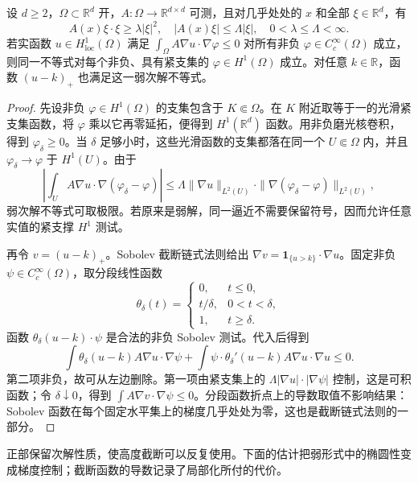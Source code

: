 \begin{lemma}
\label{b2:lem:H2-sobolev-tests}
设 \(d\geq2\)，\(\Omega\subset\mathbb R^d\) 开，\(A:\Omega\to\mathbb R^{d\times d}\) 可测，且对几乎处处的 \(x\) 和全部 \(\xi\in\mathbb R^d\)，有
\[
 A(x)\xi\cdot\xi\geq\lambda|\xi|^2,
 \quad |A(x)\xi|\leq\Lambda|\xi|,
 \quad 0<\lambda\leq\Lambda<\infty.
\]
若实函数 \(u\in H^1_{\mathrm{loc}}(\Omega)\) 满足
\(\int_\Omega A\nabla u\cdot\nabla\varphi\leq0\) 对所有非负 \(\varphi\in C_c^\infty(\Omega)\) 成立，则同一不等式对每个非负、具有紧支集的 \(\varphi\in H^1(\Omega)\) 成立。对任意 \(k\in\mathbb R\)，函数 \((u-k)_+\) 也满足这一弱次解不等式。
\end{lemma}
\begin{proof}
先设非负 \(\varphi\in H^1(\Omega)\) 的支集包含于 \(K\Subset\Omega\)。在 \(K\) 附近取等于一的光滑紧支集函数，将 \(\varphi\) 乘以它再零延拓，便得到 \(H^1(\mathbb R^d)\) 函数。用非负磨光核卷积，得到 \(\varphi_\delta\geq0\)。当 \(\delta\) 足够小时，这些光滑函数的支集都落在同一个 \(U\Subset\Omega\) 内，并且 \(\varphi_\delta\to\varphi\) 于 \(H^1(U)\)。由于
\[
 \left|\int_U A\nabla u\cdot\nabla(\varphi_\delta-\varphi)\right|
 \leq\Lambda\|\nabla u\|_{L^2(U)}
       \cdot\|\nabla(\varphi_\delta-\varphi)\|_{L^2(U)},
\]
弱次解不等式可取极限。若原来是弱解，同一逼近不需要保留符号，因而允许任意实值的紧支撑 \(H^1\) 测试。

再令 \(v=(u-k)_+\)。Sobolev 截断链式法则给出
\(\nabla v=\mathbf1_{\{u>k\}}\cdot\nabla u\)。固定非负 \(\psi\in C_c^\infty(\Omega)\)，取分段线性函数
\[
 \theta_\delta(t)=
 \begin{cases}
 0,&t\leq0,\\
 t/\delta,&0<t<\delta,\\
 1,&t\geq\delta.
 \end{cases}
\]
函数 \(\theta_\delta(u-k)\cdot\psi\) 是合法的非负 Sobolev 测试。代入后得到
\[
 \int\theta_\delta(u-k)A\nabla u\cdot\nabla\psi
 +\int\psi\cdot\theta_\delta'(u-k)
                      A\nabla u\cdot\nabla u\leq0.
\]
第二项非负，故可从左边删除。第一项由紧支集上的
\(\Lambda|\nabla u|\cdot|\nabla\psi|\) 控制，这是可积函数；令 \(\delta\downarrow0\)，得到
\(\int A\nabla v\cdot\nabla\psi\leq0\)。分段函数折点上的导数取值不影响结果：Sobolev 函数在每个固定水平集上的梯度几乎处处为零，这也是截断链式法则的一部分。
\end{proof}

正部保留次解性质，使高度截断可以反复使用。下面的估计把弱形式中的椭圆性变成梯度控制；截断函数的导数记录了局部化所付的代价。

